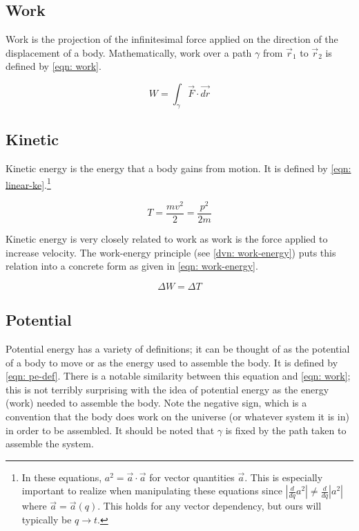 \documentclass[main.tex]{subfiles}
\begin{document}
\subsection{Work}
Work is the projection of the infinitesimal force applied on the direction of the displacement
of a body. Mathematically, work over a path $\gamma$ from $\vec{r}_1$ to $\vec{r}_2$
is defined by \cref{eqn: work}.

\begin{equation} \label{eqn: work}
W = \int_{\gamma} \vec{F} \cdot \vec{dr}
\end{equation}

\subsection{Kinetic}

Kinetic energy is the energy that a body gains from motion. It is defined by
\cref{eqn: linear-ke}.\footnote{In these equations, $a^2 = \vec{a} \cdot \vec{a}$ for vector
quantities $\vec{a}$. This is especially important to realize when manipulating these
equations since
$\left| \frac{d}{dq} a^2 \right| \neq \frac{d}{dq} \left| a^2 \right|$ where
$\vec{a} = \vec{a}(q)$. This holds for any vector dependency, but ours will typically be
$q \to t$.}

\begin{equation}
\label{eqn: linear-ke}
T = \frac{m v^2}{2} = \frac{p^2}{2m}
\end{equation}

Kinetic energy is very closely related to work as work is the force applied to increase velocity.
The work-energy principle (see \cref{dvn: work-energy}) puts this relation into a concrete form
as given in \cref{eqn: work-energy}.

\begin{equation}
\label{eqn: work-energy}
\Delta W = \Delta T
\end{equation}

\subsection{Potential}

Potential energy has a variety of definitions; it can be thought of as the potential of a body
to move or as the energy used to assemble the body. It is defined by \cref{eqn: pe-def}.
There is a notable similarity between this equation and \cref{eqn: work}; this is not terribly
surprising with the idea of potential energy as the energy (work) needed to assemble the
body. Note the negative sign, which is a convention that the body does work on the
universe (or whatever system it is in) in order to be assembled. It should be noted that
$\gamma$ is fixed by the path taken to assemble the system.
\end{document}

